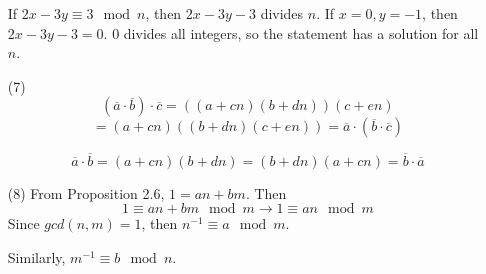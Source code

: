 \begin{itemize}
If $2x - 3y \equiv 3 \mod n$, then $2x - 3y - 3$ divides $n$. If $x = 0, y = -1$, then $2x - 3y - 3 = 0$. 0 divides all integers, so the statement has a solution for all $n$.
\item[(7)]
$$(\overline{a}\cdot\overline{b})\cdot\overline{c} = ((a + cn)(b + dn))(c + en)$$
$$= (a + cn)((b + dn)(c + en)) = \overline{a}\cdot(\overline{b}\cdot\overline{c})$$

$$\overline{a}\cdot\overline{b} = (a + cn)(b + dn) = (b + dn)(a + cn) = \overline{b}\cdot\overline{a}$$
\item[(8)]
From Proposition 2.6, $1 = an + bm$. Then
$$1 \equiv an + bm \mod m \rightarrow 1 \equiv an \mod m$$
Since $gcd(n, m) = 1$, then $n^{-1} \equiv a \mod m$.

Similarly, $m^{-1} \equiv b \mod n$.
\end{itemize}
%